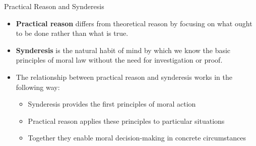 \documentclass{beamer}
\begin{document}
\begin{frame}{Practical Reason and Synderesis}
    \begin{itemize}
        \item \textbf{Practical reason} differs from theoretical reason by focusing on what ought to be done rather than what is true.
        
        \item \textbf{Synderesis} is the natural habit of mind by which we know the basic principles of moral law without the need for investigation or proof.
        
        \item The relationship between practical reason and synderesis works in the following way:
        \begin{itemize}
            \item Synderesis provides the first principles of moral action
            \item Practical reason applies these principles to particular situations
            \item Together they enable moral decision-making in concrete circumstances
        \end{itemize}
    \end{itemize}
\end{frame}
\end{document}
